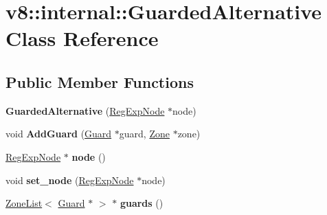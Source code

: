\hypertarget{classv8_1_1internal_1_1_guarded_alternative}{}\section{v8\+:\+:internal\+:\+:Guarded\+Alternative Class Reference}
\label{classv8_1_1internal_1_1_guarded_alternative}
\subsection*{Public Member Functions}
\begin{DoxyCompactItemize}
\item 
{\bfseries Guarded\+Alternative} (\hyperlink{classv8_1_1internal_1_1_reg_exp_node}{Reg\+Exp\+Node} $\ast$node)\hypertarget{classv8_1_1internal_1_1_guarded_alternative_a9301c0773fc8f7eb8d3672ac455fef8d}{}\label{classv8_1_1internal_1_1_guarded_alternative_a9301c0773fc8f7eb8d3672ac455fef8d}

\item 
void {\bfseries Add\+Guard} (\hyperlink{classv8_1_1internal_1_1_guard}{Guard} $\ast$guard, \hyperlink{classv8_1_1internal_1_1_zone}{Zone} $\ast$zone)\hypertarget{classv8_1_1internal_1_1_guarded_alternative_a3434f11f5f3088a4398a455795c4d316}{}\label{classv8_1_1internal_1_1_guarded_alternative_a3434f11f5f3088a4398a455795c4d316}

\item 
\hyperlink{classv8_1_1internal_1_1_reg_exp_node}{Reg\+Exp\+Node} $\ast$ {\bfseries node} ()\hypertarget{classv8_1_1internal_1_1_guarded_alternative_a19067cf32a9fe1de6d6b9e4ceb08592c}{}\label{classv8_1_1internal_1_1_guarded_alternative_a19067cf32a9fe1de6d6b9e4ceb08592c}

\item 
void {\bfseries set\+\_\+node} (\hyperlink{classv8_1_1internal_1_1_reg_exp_node}{Reg\+Exp\+Node} $\ast$node)\hypertarget{classv8_1_1internal_1_1_guarded_alternative_a44d556e4c3f0aaa9ebb23d57ec638409}{}\label{classv8_1_1internal_1_1_guarded_alternative_a44d556e4c3f0aaa9ebb23d57ec638409}

\item 
\hyperlink{classv8_1_1internal_1_1_zone_list}{Zone\+List}$<$ \hyperlink{classv8_1_1internal_1_1_guard}{Guard} $\ast$ $>$ $\ast$ {\bfseries guards} ()\hypertarget{classv8_1_1internal_1_1_guarded_alternative_ace77bbc81d1cfb1c9b1dd9f71f98c7e6}{}\label{classv8_1_1internal_1_1_guarded_alternative_ace77bbc81d1cfb1c9b1dd9f71f98c7e6}

\end{DoxyCompactItemize}
